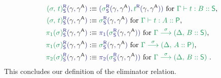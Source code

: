 \begin{defn}
\begin{align*}
\tqm{\grm{(\sigma,\,t)}^\RR_\Sc(\blgamma, \blgammaCC)}
  &:\equiv \tqm{(\grm{\sigma}^\RR_\Sc(\blgamma, \blgammaCC) , \grm{t}^\RR(\blgamma, \blgammaCC))}
    \text{ for \grm{\Gamma \vdash t : B :: \Sc},} \\
\tqm{\grm{(\sigma,\,t)}^\RR_\Sc(\blgamma, \blgammaCC)}
  &:\equiv \tqm{\grm{\sigma}^\RR_\Sc(\blgamma, \blgammaCC)} \text{ for \grm{\Gamma \vdash t : A :: \Pc},} \\
\tqm{\grm{\pi_1(\sigma)}^\RR_\Sc(\blgamma, \blgammaCC)}
  &:\equiv \tqm{\pi_1(\grm{\sigma}^\RR_\Sc(\blgamma, \blgammaCC))} \text{ for \grm{\IISub{\sigma}{\Gamma}{(\Delta,\, B :: \Sc)}},} \\
\tqm{\grm{\pi_1(\sigma)}^\RR_\Sc(\blgamma, \blgammaCC)}
  &:\equiv \tqm{\grm{\sigma}^\RR_\Sc(\blgamma, \blgammaCC)} \text{ for \grm{\IISub{\sigma}{\Gamma}{(\Delta,\, A :: \Pc)}},} \\
\tqm{\grm{\pi_2(\sigma)}^\RR_\Sc(\blgamma, \blgammaCC)}
  &:\equiv \tqm{\pi_2(\grm{\sigma}^\RR_\Sc(\blgamma, \blgammaCC))} \text{ for \grm{\IISub{\sigma}{\Gamma}{(\Delta ,\, B :: \Sc)}} .}
\end{align*}
This concludes our definition of the eliminator relation.
\end{defn}





















